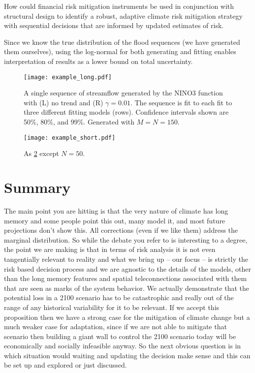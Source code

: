 \documentclass[12pt]{article}
\begin{document}
How could  financial risk mitigation instruments be used in conjunction with structural design to identify a robust, adaptive climate risk mitigation strategy with sequential decisions that are informed by updated estimates of risk.

Since we know the true distribution of the flood sequences (we have generated them ourselves), using the log-normal for both generating and fitting enables interpretation of results as a lower bound on total uncertainty.

\begin{figure}
  \texttt{[image: example\_long.pdf]}
  \caption{
    A single sequence of streamflow generated by the NINO3 function with (L) no trend and (R) \(\gamma=0.01\). 
    The sequence is fit to each fit to three different fitting models (rows).
    Confidence intervals shown are 50\%, 80\%, and 99\%.
    Generated with \(M=N=150\).\label{fig:example-long}
  }
\end{figure}

\begin{figure}
  \texttt{[image: example\_short.pdf]}
  \caption{
    As \cref{fig:example-short} except \(N=50\).\label{fig:example-short}
  }
\end{figure}



\section{Summary}

The main point you are hitting is that the very nature of climate has long memory and some people point this out, many model it, and most future projections don't show this.
All corrections (even if we like them) address the marginal distribution.
So while the debate you refer to is interesting to a degree, the point we are making is that in terms of risk analysis it is not even tangentially relevant to reality and what we bring up -- our focus -- is strictly the risk based decision process and we are agnostic to the details of the models, other than the long memory features and spatial teleconnections associated with them that are seen as marks of the system behavior.
We actually demonstrate that the potential loss in a 2100 scenario has to be catastrophic and really out of the range of any historical variability for it to be relevant.
If we accept this proposition then we have a strong case for the mitigation of climate change but a much weaker case for adaptation, since if we are not able to mitigate that scenario then building a giant wall to control the 2100 scenario today will be economically and socially infeasible anyway.
So the next obvious question is in which situation would waiting and updating the decision make sense and this can be set up and explored or just discussed.
\end{document}

